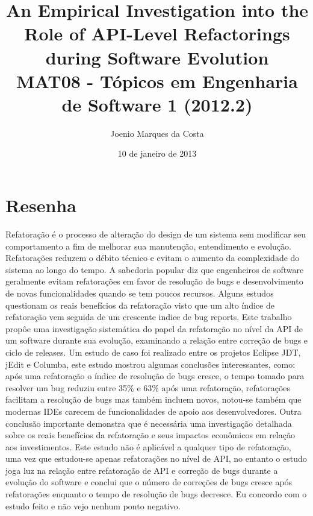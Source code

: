 \documentclass[12pt]{article}
\title{An Empirical Investigation into the Role of API-Level Refactorings
 during Software Evolution\cite{AnEmpiricalInvestigation} \\
 \large MAT08 - Tópicos em Engenharia de Software 1 (2012.2)}
\author{Joenio Marques da Costa}
\date{10 de janeiro de 2013}
\begin{document}
\maketitle

\section*{Resenha}

Refatoração é o processo de alteração do design de um sistema sem modificar seu
comportamento a fim de melhorar sua manutenção, entendimento e evolução.
Refatorações reduzem o débito técnico e evitam o aumento da complexidade do
sistema ao longo do tempo. A sabedoria popular diz que engenheiros de software
geralmente evitam refatorações em favor de resolução de bugs e desenvolvimento
de novas funcionalidades quando se tem poucos recursos. Alguns estudos
questionam os reais benefícios da refatoração visto que um alto índice de
refatoração vem seguida de um crescente indice de bug reports. Este trabalho
propôe uma investigação sistemática do papel da refatoração no nível da API de
um software durante sua evolução, examinando a relação entre correção de bugs e
ciclo de releases. Um estudo de caso foi realizado entre os projetos Eclipse
JDT, jEdit e Columba, este estudo mostrou algumas conclusões interessantes,
como: após uma refatoração o índice de resolução de bugs cresce, o tempo tomado
para resolver um bug reduziu entre 35\% e 63\% após uma refatoração,
refatorações facilitam a resolução de bugs mas também incluem novos, notou-se
também que modernas IDEs carecem de funcionalidades de apoio aos
desenvolvedores. Outra conclusão importante demonstra que é necessária uma
investigação detalhada sobre os reais benefícios da refatoração e seus impactos
econômicos em relação aos investimentos. Este estudo não é aplicável a qualquer
tipo de refatoração, uma vez que estudou-se apenas refatorações no nível de
API, no entanto o estudo joga luz na relação entre refatoração de API e
correção de bugs durante a evolução do software e conclui que o número de
correções de bugs cresce após refatorações enquanto o tempo de resolução de
bugs decresce. Eu concordo com o estudo feito e não vejo nenhum ponto negativo.


\end{document}
